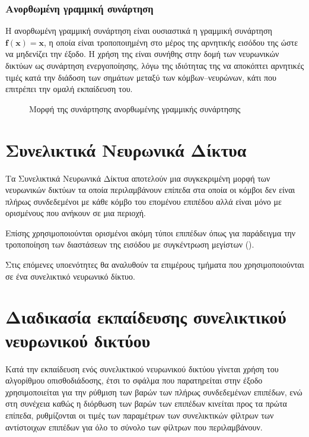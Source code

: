\subsubsection{Ανορθωμένη γραμμική συνάρτηση }
Η ανορθωμένη γραμμική συνάρτηση  είναι ουσιαστικά η γραμμική συνάρτηση $\mathit{\mathbf{f\left(x\right) = x}}$, η οποία είναι τροποποιημένη στο μέρος της αρνητικής εισόδου της ώστε να μηδενίζει την έξοδο. Η χρήση της είναι συνήθης στην δομή των νευρωνικών δικτύων ως συνάρτηση ενεργοποίησης, λόγω της ιδιότητας της να αποκόπτει αρνητικές τιμές κατά την διάδοση των σημάτων μεταξύ των κόμβων--νευρώνων, κάτι που επιτρέπει την ομαλή εκπαίδευση του.

\begin{figure}[H]
  \begin{center}
    
    \caption{Μορφή της συνάρτησης ανορθωμένης γραμμικής συνάρτησης }
  \end{center}
\end{figure}

\section{Συνελικτικά Νευρωνικά Δίκτυα}
Τα Συνελικτικά Νευρωνικά Δίκτυα αποτελούν μια συγκεκριμένη μορφή των νευρωνικών δικτύων τα οποία περιλαμβάνουν επίπεδα στα οποία οι κόμβοι δεν είναι πλήρως συνδεδεμένοι με κάθε κόμβο του επομένου επιπέδου αλλά είναι μόνο με ορισμένους που ανήκουν σε μια περιοχή.

Επίσης χρησιμοποιούνται ορισμένοι ακόμη τύποι επιπέδων όπως για παράδειγμα την τροποποίηση των διαστάσεων της εισόδου με συγκέντρωση μεγίστων ().

Στις επόμενες υποενότητες θα αναλυθούν τα επιμέρους τμήματα που χρησιμοποιούνται σε ένα συνελικτικό νευρωνικό δίκτυο.

\section{Διαδικασία εκπαίδευσης συνελικτικού νευρωνικού δικτύου}
Κατά την εκπαίδευση ενός συνελικτικού νευρωνικού δικτύου γίνεται χρήση του αλγορίθμου οπισθοδιάδοσης, έτσι το σφάλμα που παρατηρείται στην έξοδο χρησιμοποιείται για την ρύθμιση των βαρών των πλήρως συνδεδεμένων επιπέδων, ενώ στη συνέχεια καθώς η διόρθωση των βαρών των επιπέδων κινείται προς τα πρώτα επίπεδα, ρυθμίζονται οι τιμές των παραμέτρων των συνελικτικών φίλτρων των αντίστοιχων επιπέδων για όλο το σύνολο των φίλτρων που περιλαμβάνουν.\\

